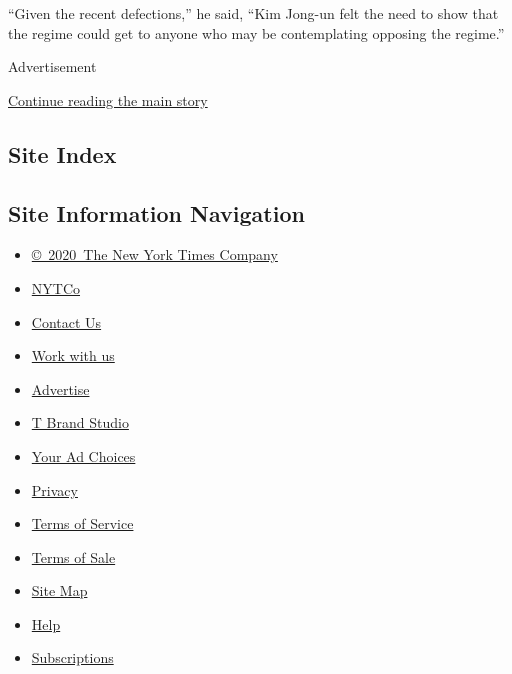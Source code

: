 ``Given the recent defections,'' he said, ``Kim Jong-un felt the need to
show that the regime could get to anyone who may be contemplating
opposing the regime.''

Advertisement

\protect\hyperlink{after-bottom}{Continue reading the main story}

\hypertarget{site-index}{%
\subsection{Site Index}\label{site-index}}

\hypertarget{site-information-navigation}{%
\subsection{Site Information
Navigation}\label{site-information-navigation}}

\begin{itemize}
\tightlist
\item
  \href{https://help.nytimes3xbfgragh.onion/hc/en-us/articles/115014792127-Copyright-notice}{©~2020~The
  New York Times Company}
\end{itemize}

\begin{itemize}
\tightlist
\item
  \href{https://www.nytco.com/}{NYTCo}
\item
  \href{https://help.nytimes3xbfgragh.onion/hc/en-us/articles/115015385887-Contact-Us}{Contact
  Us}
\item
  \href{https://www.nytco.com/careers/}{Work with us}
\item
  \href{https://nytmediakit.com/}{Advertise}
\item
  \href{http://www.tbrandstudio.com/}{T Brand Studio}
\item
  \href{https://www.nytimes3xbfgragh.onion/privacy/cookie-policy\#how-do-i-manage-trackers}{Your
  Ad Choices}
\item
  \href{https://www.nytimes3xbfgragh.onion/privacy}{Privacy}
\item
  \href{https://help.nytimes3xbfgragh.onion/hc/en-us/articles/115014893428-Terms-of-service}{Terms
  of Service}
\item
  \href{https://help.nytimes3xbfgragh.onion/hc/en-us/articles/115014893968-Terms-of-sale}{Terms
  of Sale}
\item
  \href{https://spiderbites.nytimes3xbfgragh.onion}{Site Map}
\item
  \href{https://help.nytimes3xbfgragh.onion/hc/en-us}{Help}
\item
  \href{https://www.nytimes3xbfgragh.onion/subscription?campaignId=37WXW}{Subscriptions}
\end{itemize}
